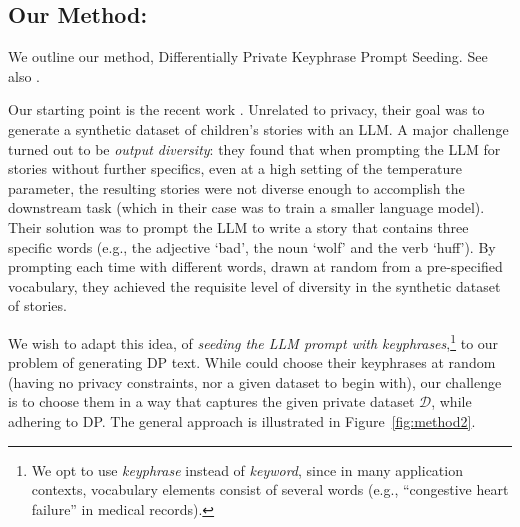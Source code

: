 

\subsection{Our Method: \alg}\label{sec:intro_method}
We outline our method, Differentially Private  Keyphrase Prompt Seeding. See also .



Our starting point is the recent work \cite{eldan2023tinystories}. 
Unrelated to privacy, their goal was to generate a synthetic dataset of children's stories with an LLM.  
A major challenge turned out to be \emph{output diversity}:
they found that when prompting the LLM for stories without further specifics, even at a high setting of the temperature parameter, the resulting stories were not diverse enough to accomplish the downstream task (which in their case was to train a smaller language model). Their solution was to prompt the LLM to write a story that contains three specific words (e.g., the adjective `bad', the noun `wolf' and the verb `huff'). By prompting each time with different words, drawn at random from a pre-specified vocabulary, they achieved the requisite level of diversity in the synthetic dataset of stories. 

We wish to adapt this idea, of \emph{seeding the LLM prompt with keyphrases},\footnote{We opt to use \emph{keyphrase} instead of \emph{keyword}, since in many application contexts, vocabulary elements consist of several words (e.g., ``congestive heart failure'' in medical records).} to our problem of generating DP text. 
While \cite{eldan2023tinystories} could choose their keyphrases at random (having no privacy constraints, nor a given dataset to begin with), our challenge is to choose them in a way that captures the given private dataset $\mathcal D$, while adhering to DP.  The general approach is illustrated in Figure~\ref{fig:method2}.




